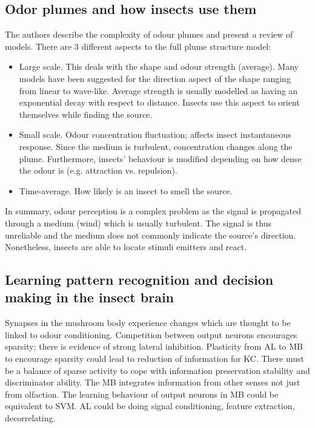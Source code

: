 \documentclass[11pt,a4paper]{article}
\begin{document}
    \subsection{Odor plumes and how insects use them}
    The authors describe the complexity of odour plumes and present a review of models. 
    There are 3 different aspects to the full plume structure model:
    \begin{itemize}
      \item Large scale. 
      This deals with the shape and odour strength (average). 
      Many models have been suggested for the direction aspect of the shape ranging from linear to wave-like. 
      Average strength is usually modelled as having an exponential decay with respect to distance.
      Insects use this aspect to orient themselves while finding the source. 
      
      \item Small scale. Odour concentration fluctuation; affects insect instantaneous response.
      Since the medium is turbulent, concentration changes along the plume. 
      Furthermore, insects' behaviour is modified depending on how dense the odour is (e.g. attraction vs. repulsion). 
      
      \item Time-average. How likely is an insect to smell the source.
      
    \end{itemize}
    In summary, odour perception is a complex problem as the signal is propagated through a medium (wind) which is usually turbulent. 
    The signal is thus unreliable and the medium does not commonly indicate the source's direction.
    Nonetheless, insects are able to locate stimuli emitters and react.

    \subsection{Learning pattern recognition and decision making in the insect brain}
    Synapses in the mushroom body experience changes which are thought to be linked to odour conditioning.
    Competition between output neurons encourages sparsity; there is evidence of strong lateral inhibition.
    Plasticity from AL to MB to encourage sparsity could lead to reduction of information for KC.
    There must be a balance of sparse activity to cope with information preservation stability and discriminator ability.
    The MB integrates information from other senses not just from olfaction.
    The learning behaviour of output neurons in MB could be equivalent to SVM.
    AL could be doing signal conditioning, feature extraction, decorrelating.
\end{document}
